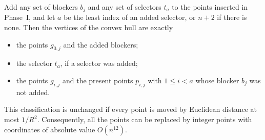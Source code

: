 \begin{lemma}\label{lem:hull-selector-count}
Add any set of blockers $b_j$ and any set of selectors $t_a$ to the points inserted in Phase~I, and let $a$ be the least index of an added selector, or $n+2$ if there is none. Then the vertices of the convex hull are exactly
\begin{itemize}[leftmargin=*]
  \item the points $g_{0,j}$ and the added blockers;
  \item the selector $t_a$, if a selector was added;
  \item the points $g_{i,j}$ and the present points $p_{i,j}$ with $1\le i<a$ whose blocker $b_j$ was not added.
\end{itemize}
This classification is unchanged if every point is moved by Euclidean distance at most $1/R^2$. Consequently, all the points can be replaced by integer points with coordinates of absolute value $O(n^{12})$.
\end{lemma}

